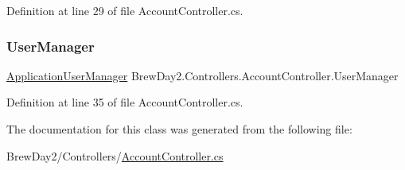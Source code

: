 Definition at line 29 of file Account\+Controller.\+cs.

\mbox{\label{class_brew_day2_1_1_controllers_1_1_account_controller_a3b0d883fe8e12fe7b266edac6447e0e8}} 
\subsubsection{\texorpdfstring{User\+Manager}{UserManager}}
{\footnotesize\ttfamily \mbox{\hyperlink{class_brew_day2_1_1_application_user_manager}{Application\+User\+Manager}} Brew\+Day2.\+Controllers.\+Account\+Controller.\+User\+Manager\hspace{0.3cm}{\ttfamily [get]}}



Definition at line 35 of file Account\+Controller.\+cs.



The documentation for this class was generated from the following file\+:\begin{DoxyCompactItemize}
\item 
Brew\+Day2/\+Controllers/\mbox{\hyperlink{_account_controller_8cs}{Account\+Controller.\+cs}}\end{DoxyCompactItemize}
